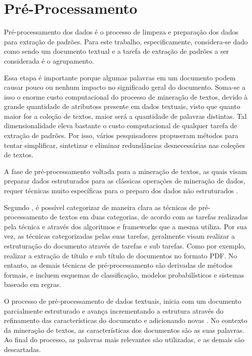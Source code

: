 \section{Pré-Processamento} Pré-processamento dos dados é o processo de limpeza e preparação dos
dados para extração de padrões.  Para este trabalho, especificamente, considera-se dado como sendo um documento textual e a tarefa de extração de padrões a ser considerada é o agrupamento.

Essa etapa é importante porque algumas palavras em um documento podem causar pouco ou nenhum impacto no significado geral do documento\cite{Haddi2013}.  Soma-se a isso o enorme custo computacional do
processo de mineração de textos, devido à grande quantidade de atributoss presente em dados textuais, visto que quanto maior for a coleção de textos, maior será a quantidade de palavras distintas. Tal dimensionalidade eleva bastante o custo computacional de qualquer tarefa de extração de padrões.  Por isso, vários pesquisadores propuseram
métodos para tentar simplificar, sintetizar e eliminar redundâncias desnecessárias nas coleções de
textos.  

A fase de pré-processamento voltada para a mineração de textos, as quais visam preparar dados estruturados para
as clássicas operações de mineração de dados, requer técnicas muito específicas para o
preparo dos dados não estruturados \cite{Feldman2007}.

Segundo \cite{Feldman2007}, é possível categorizar de maneira clara as técnicas de pré-processamento
de textos em duas categorias, de acordo com as tarefas realizadas pela técnica e através dos
algoritmos e frameworks que a mesma utiliza. Por sua vez, as técnicas categorizadas pelas suas
tarefas, geralmente visam realizar a estruturação do documento através de tarefas e sub tarefas.
Como por exemplo, realizar a extração de título e sub título de documentos no formato PDF.  No
entanto, as demais técnicas de pré-processamento são derivadas de métodos formais, e incluem
esquemas de classificação, modelos probabilísticos e sistemas baseado em regras.

O processo de pré-processamento de dados textuais, inicia com um documento parcialmente estruturado
e avança incrementando a estrutura através do refinamento das características do documento e
adicionando novas \cite{Feldman2007}.  No contexto da mineração de textos, as características dos
documentos são as suas palavras\cite{Haddi2013}. Ao final do processo, as palavras mais relevantes
são utilizadas, e as demais são descartadas.

